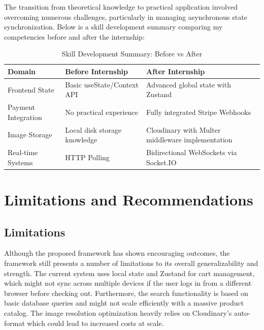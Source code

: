 \documentclass[12pt,a4paper]{report}
\begin{document}
\newpage
The transition from theoretical knowledge to practical application involved overcoming numerous challenges, particularly in managing asynchronous state synchronization. Below is a skill development summary comparing my competencies before and after the internship:

\begin{table}[htbp]
\centering
\caption{Skill Development Summary: Before vs After}
\label{tab:skill_dev}
\vspace{0.2cm}
\begin{tabular}{|p{4.5cm}|p{5cm}|p{5cm}|}
\hline
\textbf{Domain} & \textbf{Before Internship} & \textbf{After Internship} \\ \hline
Frontend State & Basic useState/Context API & Advanced global state with Zustand \\ \hline
Payment Integration & No practical experience & Fully integrated Stripe Webhooks \\ \hline
Image Storage & Local disk storage knowledge & Cloudinary with Multer middleware implementation \\ \hline
Real-time Systems & HTTP Polling & Bidirectional WebSockets via Socket.IO \\ \hline
\end{tabular}
\end{table}


\chapter{Limitations and Recommendations}
\section{Limitations}
Although the proposed framework has shown encouraging outcomes, the framework still presents a number of limitations to its overall generalizability and strength. The current system uses local state and Zustand for cart management, which might not sync across multiple devices if the user logs in from a different browser before checking out. Furthermore, the search functionality is based on basic database queries and might not scale efficiently with a massive product catalog. The image resolution optimization heavily relies on Cloudinary's auto-format which could lead to increased costs at scale.
\end{document}
